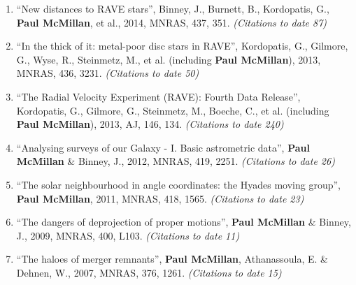 \documentclass{resume}
\begin{document}
\begin{enumerate}
\item ``New distances to RAVE stars'', Binney, J., Burnett, B., Kordopatis, G., \textbf{Paul McMillan}, et al., 2014, MNRAS, 437, 351. \textit{(Citations to date 87)}

\item ``In the thick of it: metal-poor disc stars in RAVE'', Kordopatis, G., Gilmore, G., Wyse, R., Steinmetz, M., et al. (including \textbf{Paul McMillan}), 2013, MNRAS, 436, 3231. \textit{(Citations to date 50)}

\item ``The Radial Velocity Experiment (RAVE): Fourth Data Release'', Kordopatis, G., Gilmore, G., Steinmetz, M., Boeche, C., et al. (including \textbf{Paul McMillan}), 2013, AJ, 146, 134. \textit{(Citations to date 240)}

\item ``Analysing surveys of our Galaxy - I. Basic astrometric data'', \textbf{Paul McMillan} \& Binney, J., 2012, MNRAS, 419, 2251. \textit{(Citations to date 26)}

\item ``The solar neighbourhood in angle coordinates: the Hyades moving group'', \textbf{Paul McMillan}, 2011, MNRAS, 418, 1565. \textit{(Citations to date 23)}

\item ``The dangers of deprojection of proper motions'', \textbf{Paul McMillan} \& Binney, J., 2009, MNRAS, 400, L103. \textit{(Citations to date 11)}

\item ``The haloes of merger remnants'', \textbf{Paul McMillan}, Athanassoula, E. \& Dehnen, W., 2007, MNRAS, 376, 1261. \textit{(Citations to date 15)}

\end{enumerate}
\end{document}
